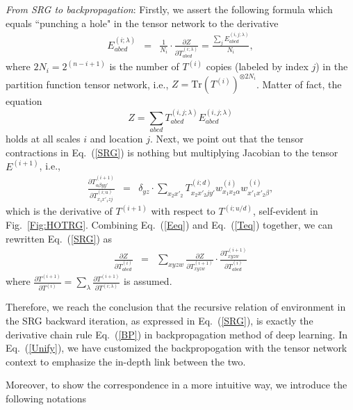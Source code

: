 \documentclass[aps,prx,twocolumn,showpacs,psfig,superscriptaddress,longbibliography]{revtex4-1}
\def\lsb#1{\left(#1\right)}              %
\def\beqn{\begin{eqnarray}}
\def\eeqn{\end{eqnarray}}
\def\pd#1#2{\frac{\partial{#1}}{\partial{#2}}}
\begin{document}
\textit{From SRG to backpropagation}: Firstly, we assert the following formula which equals ``punching a hole" in the tensor network to the derivative
\beqn
E^{(i;\lambda)}_{abcd} &=& \frac{1}{N_i}\cdot\pd{Z}{T^{(i;\lambda)}_{abcd}} = \frac{\sum_{j}E^{(i,j;\lambda)}_{abcd}}{N_i},  \label{Eeq}
\eeqn
where $2N_i = 2^{(n-i+1)}$ is the number of $T^{(i)}$ copies (labeled by index $j$) in the partition function tensor network, i.e., $Z = \mathrm{Tr}\lsb{T^{(i)}}^{\otimes 2N_i}$. Matter of fact, the equation $$Z = \sum_{abcd}T^{(i,j;\lambda)}_{abcd}E^{(i,j;\lambda)}_{abcd}$$ holds at all scales $i$ and location $j$. Next, we point out that the tensor contractions in Eq.~(\ref{SRG}) is nothing but multiplying Jacobian to the tensor $E^{(i+1)}$, i.e.,
\beqn
\pd{T^{(i+1)}_{\alpha\beta yy'}}{T^{(i;u)}_{x_1x'_1zj}} &=& \delta_{yz}\cdot\sum_{x_2x'_2}T^{(i;d)}_{x_2x'_2jy'}w^{(i)}_{x_1x_2\alpha}w^{(i)}_{x'_1x'_2\beta}, \label{Teq}
\eeqn
which is the derivative of $T^{(i+1)}$ with respect to $T^{(i;u/d)}$, self-evident in Fig.~\ref{Fig:HOTRG}. Combining Eq.~(\ref{Eeq}) and Eq.~(\ref{Teq}) together, we can rewritten Eq.~(\ref{SRG}) as
\beqn
\pd{Z}{T^{(i)}_{abcd}} &=& \sum_{xyzw}\pd{Z}{T^{(i+1)}_{xyzw}}\cdot\pd{T^{(i+1)}_{xyzw}}{T^{(i)}_{abcd}} \label{Unify}
\eeqn
where $\pd{T^{(i+1)}}{T^{(i)}} = \sum_{\lambda}\pd{T^{(i+1)}}{T^{(i;\lambda)}}$ is assumed.

Therefore, we reach the conclusion that the recursive relation of environment in the SRG backward iteration, as expressed in Eq.~(\ref{SRG}), is exactly the derivative chain rule Eq.~(\ref{BP}) in backpropagation method of deep learning. In Eq.~(\ref{Unify}), we have customized the backpropogation with the tensor network context to emphasize the in-depth link between the two.

Moreover, to show the correspondence in a more intuitive way, we introduce the following notations
\end{document}
